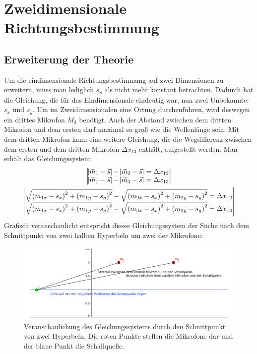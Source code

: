 \section{Zweidimensionale Richtungsbestimmung}
\subsection{Erweiterung der Theorie}
Um die eindimensionale Richtungsbestimmung auf zwei Dimensionen zu erweitern, muss man lediglich $s_y$ als nicht mehr konstant betrachten. Dadurch hat die Gleichung, die für das Eindimensionale eindeutig war, nun zwei Unbekannte: $s_x$ und $s_y$. Um im Zweidimensionalen eine Ortung durchzuführen, wird deswegen ein drittes Mikrofon $M_3$ benötigt. Auch der Abstand zwischen dem dritten Mikrofon und dem ersten darf maximal so groß wie die Wellenlänge sein. Mit dem dritten Mikrofon kann eine weitere Gleichung, die die Wegdifferenz zwischen dem ersten und dem dritten Mikrofon $\Delta{x_{13}}$ enthält, aufgestellt werden. Man erhält das Gleichungssystem:
\begin{gather}\begin{vmatrix}
  \abs{\vec{m}_1 - \vec{s}} - \abs{\vec{m}_2 - \vec{s}} = \Delta{x_{12}} \\
  \abs{\vec{m}_1 - \vec{s}} - \abs{\vec{m}_3 - \vec{s}} = \Delta{x_{13}}
\end{vmatrix}\\
\begin{vmatrix}
  \sqrt{{(m_{1x} - s_x)}^2 + {(m_{1y} - s_y)}^2} - \sqrt{{(m_{2x} - s_x)}^2 + {(m_{2y} - s_y)}^2} = \Delta{x_{12}} \\
  \sqrt{{(m_{1x} - s_x)}^2 + {(m_{1y} - s_y)}^2} - \sqrt{{(m_{3x} - s_x)}^2 + {(m_{3y} - s_y)}^2} = \Delta{x_{13}}
\end{vmatrix}
\end{gather}
Grafisch veranschaulicht entspricht dieses Gleichungssystem der Suche nach dem Schnittpunkt von zwei halben Hyperbeln um zwei der Mikrofone:
\begin{figure}[H]
	\vspace{-20pt}
  \includegraphics[width=\linewidth]{img/skizze1d}
  \caption{Veranschaulichung des Gleichungssystems durch den Schnittpunkt von zwei Hyperbeln. Die roten Punkte stellen die Mikrofone dar und der blaue Punkt die Schallquelle.}
\end{figure}

